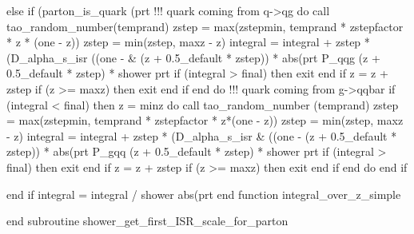       else if (parton_is_quark (prt%
         !!! quark coming from q->qg
         do
            call tao_random_number(temprand)
            zstep = max(zstepmin, temprand * zstepfactor * z * (one - z))
            zstep = min(zstep, maxz - z)
            integral = integral + zstep * (D_alpha_s_isr ((one - &
                 (z + 0.5_default * zstep)) * abs(prt%
                 P_qqg (z + 0.5_default * zstep) * shower%
                 prt%
            if (integral > final) then
               exit
            end if
            z = z + zstep
            if (z >= maxz) then
               exit
            end if
         end do
         !!! quark coming from g->qqbar
         if (integral < final) then
            z = minz
            do
               call tao_random_number (temprand)
               zstep = max(zstepmin, temprand * zstepfactor * z*(one - z))
               zstep = min(zstep, maxz - z)
               integral = integral + zstep * (D_alpha_s_isr &
                    ((one - (z + 0.5_default * zstep)) * abs(prt%
                    P_gqq (z + 0.5_default * zstep) * shower%
                    prt%
               if (integral > final) then
                  exit
               end if
               z = z + zstep
               if (z >= maxz) then
                  exit
               end if
            end do
         end if

      end if
      integral = integral / shower%
           abs(prt%
    end function integral_over_z_simple

  end subroutine shower_get_first_ISR_scale_for_parton

